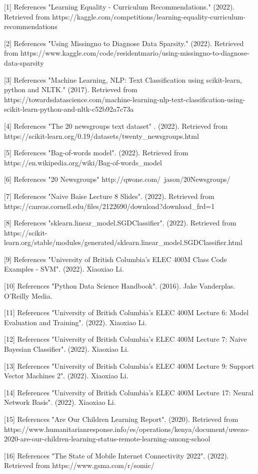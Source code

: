 \documentclass{article}
\begin{document}
{
\small

[1] References "Learning Equality - Curriculum Recommendations." (2022). Retrieved from https://kaggle.com/competitions/learning-equality-curriculum-recommendations

[2] References "Using Missingno to Diagnose Data Sparsity." (2022). Retrieved from https://www.kaggle.com/code/residentmario/using-missingno-to-diagnose-data-sparsity 

[3] References "Machine Learning, NLP: Text Classification using scikit-learn, python and NLTK." (2017). Retrieved from https://towardsdatascience.com/machine-learning-nlp-text-classification-using-scikit-learn-python-and-nltk-c52b92a7c73a

[4] References "The 20 newsgroups text dataset" . (2022). Retrieved from https://scikit-learn.org/0.19/datasets/twenty_newsgroups.html 

[5] References "Bag-of-words model". (2022). Retrieved from https://en.wikipedia.org/wiki/Bag-of-words_model 

[6] References "20 Newsgroups"  http://qwone.com/~jason/20Newsgroups/ 

[7] References "Naive Baise Lecture 8 Slides". (2022). Retrieved from https://canvas.cornell.edu/files/2122690/download?download_frd=1 

[8] References "sklearn.linear_model.SGDClassifier". (2022). Retrieved from https://scikit-learn.org/stable/modules/generated/sklearn.linear_model.SGDClassifier.html

[9] References "University of British Columbia's ELEC 400M Class Code Examples - SVM". (2022). Xiaoxiao Li.

[10] References "Python Data Science Handbook". (2016). Jake Vanderplas. O'Reilly Media. 

[11] References "University of British Columbia's ELEC 400M Lecture 6: Model Evaluation and Training". (2022). Xiaoxiao Li.  

[12] References "University of British Columbia's ELEC 400M Lecture 7: Naive Bayesian Classifier". (2022). Xiaoxiao Li.  

[13] References "University of British Columbia's ELEC 400M Lecture 9: Support Vector Machines 2". (2022). Xiaoxiao Li. 

[14] References "University of British Columbia's ELEC 400M Lecture 17: Neural Network Basis". (2022). Xiaoxiao Li.

[15] References "Are Our Children Learning Report". 
 (2020). Retrieved from https://www.humanitarianresponse.info/es/operations/kenya/document/uwezo-2020-are-our-children-learning-status-remote-learning-among-school 

 [16] References "The State of Mobile Internet Connectivity 2022". (2022). Retrieved from https://www.gsma.com/r/somic/
 
}
\end{document}
